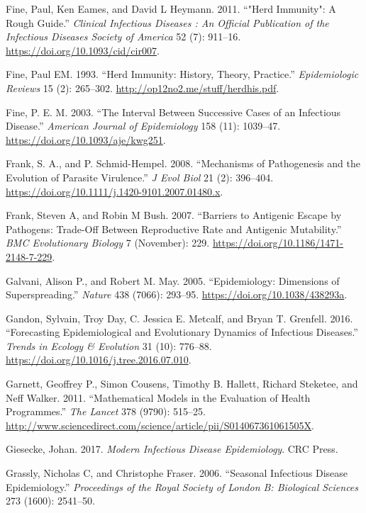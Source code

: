 \documentclass[
]{book}
\begin{document}
\leavevmode\hypertarget{ref-fine11}{}%
Fine, Paul, Ken Eames, and David L Heymann. 2011. ``"Herd Immunity": A Rough Guide.'' \emph{Clinical Infectious Diseases : An Official Publication of the Infectious Diseases Society of America} 52 (7): 911--16. \url{https://doi.org/10.1093/cid/cir007}.

\leavevmode\hypertarget{ref-fine93}{}%
Fine, Paul EM. 1993. ``Herd Immunity: History, Theory, Practice.'' \emph{Epidemiologic Reviews} 15 (2): 265--302. \url{http://op12no2.me/stuff/herdhis.pdf}.

\leavevmode\hypertarget{ref-fine03}{}%
Fine, P. E. M. 2003. ``The Interval Between Successive Cases of an Infectious Disease.'' \emph{American Journal of Epidemiology} 158 (11): 1039--47. \url{https://doi.org/10.1093/aje/kwg251}.

\leavevmode\hypertarget{ref-frank08}{}%
Frank, S. A., and P. Schmid-Hempel. 2008. ``Mechanisms of Pathogenesis and the Evolution of Parasite Virulence.'' \emph{J Evol Biol} 21 (2): 396--404. \url{https://doi.org/10.1111/j.1420-9101.2007.01480.x}.

\leavevmode\hypertarget{ref-frank07}{}%
Frank, Steven A, and Robin M Bush. 2007. ``Barriers to Antigenic Escape by Pathogens: Trade-Off Between Reproductive Rate and Antigenic Mutability.'' \emph{BMC Evolutionary Biology} 7 (November): 229. \url{https://doi.org/10.1186/1471-2148-7-229}.

\leavevmode\hypertarget{ref-galvani05}{}%
Galvani, Alison P., and Robert M. May. 2005. ``Epidemiology: Dimensions of Superspreading.'' \emph{Nature} 438 (7066): 293--95. \url{https://doi.org/10.1038/438293a}.

\leavevmode\hypertarget{ref-gandon16}{}%
Gandon, Sylvain, Troy Day, C. Jessica E. Metcalf, and Bryan T. Grenfell. 2016. ``Forecasting Epidemiological and Evolutionary Dynamics of Infectious Diseases.'' \emph{Trends in Ecology \& Evolution} 31 (10): 776--88. \url{https://doi.org/10.1016/j.tree.2016.07.010}.

\leavevmode\hypertarget{ref-garnett11}{}%
Garnett, Geoffrey P., Simon Cousens, Timothy B. Hallett, Richard Steketee, and Neff Walker. 2011. ``Mathematical Models in the Evaluation of Health Programmes.'' \emph{The Lancet} 378 (9790): 515--25. \url{http://www.sciencedirect.com/science/article/pii/S014067361061505X}.

\leavevmode\hypertarget{ref-giesecke17}{}%
Giesecke, Johan. 2017. \emph{Modern Infectious Disease Epidemiology}. CRC Press.

\leavevmode\hypertarget{ref-grassly06}{}%
Grassly, Nicholas C, and Christophe Fraser. 2006. ``Seasonal Infectious Disease Epidemiology.'' \emph{Proceedings of the Royal Society of London B: Biological Sciences} 273 (1600): 2541--50.
\end{document}
